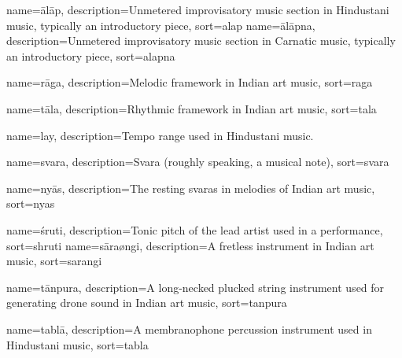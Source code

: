 
{
	name={\={a}l\={a}p},
	description={Unmetered improvisatory music section in Hindustani music, typically an introductory piece},
	sort=alap
}
{
	name={\={a}l\={a}pna},
	description={Unmetered improvisatory music section in Carnatic music, typically an introductory piece},
	sort=alapna
}

{
  name={r\={a}ga},
  description={Melodic framework in Indian art music},
  sort=raga
}

{
	name={t\={a}la},
	description={Rhythmic framework in Indian art music},
	sort=tala
}

{
	name={lay},
	description={Tempo range used in Hindustani music.}
}

{
	name={svara},
	description={Svara (roughly speaking, a musical note)},
	sort=svara
}


{
	name={ny\={a}s},
	description={The resting svaras in melodies of Indian art music},
	sort=nyas
}

{
	name={\'sruti},
	description={Tonic pitch of the lead artist used in a performance},
	sort=shruti
}
{
	name={s\={a}ra\o{n}gi},
	description={A fretless instrument in Indian art music},
	sort=sarangi
}

{
	name={t\={a}npura},
	description={A long-necked plucked string instrument used for generating drone sound in Indian art music},
	sort=tanpura
}

{
	name={tabl\={a}},
	description={A membranophone percussion instrument used in Hindustani music},
	sort=tabla
}

	
	
	
			
